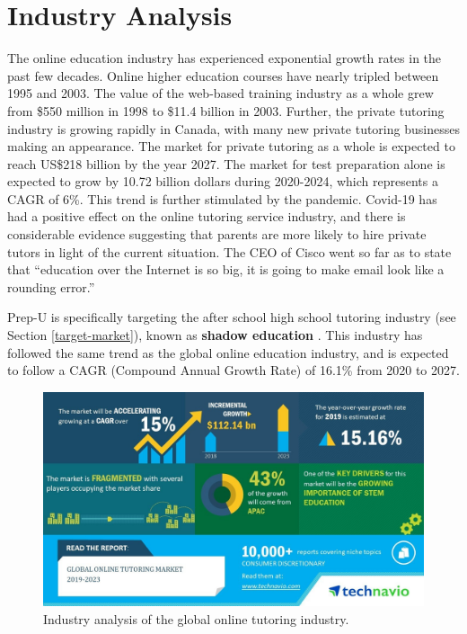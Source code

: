 \documentclass{business}
\begin{document}
    \section{Industry Analysis}\label{industry-analysis}
    The online education industry has experienced exponential growth rates in the past few decades. Online higher education courses have nearly tripled between 1995 and 2003. \cite{Wiest2012} The value of the web-based training industry as a whole grew from \$550 million in 1998 to \$11.4 billion in 2003. \cite{Singh2004} Further, the private tutoring industry is growing rapidly in Canada, with many new private tutoring businesses making an appearance. \cite{Davies} The market for private tutoring as a whole is expected to reach US\$218 billion by the year 2027. \cite{Private2020} The market for test preparation alone is expected to grow by 10.72 billion dollars during 2020-2024, which represents a CAGR of 6\%. \cite{TestPrep2020} This trend is further stimulated by the pandemic. Covid-19 has had a positive effect on the online tutoring service industry, and there is considerable evidence suggesting that parents are more likely to hire private tutors in light of the current situation. The CEO of Cisco went so far as to state that ``education over the Internet is so big, it is going to make email look like a rounding error.''\par
    Prep-U is specifically targeting the after school high school tutoring industry (see Section \ref{target-market}), known as \textbf{shadow education} \cite{Zhang}. This industry has followed the same trend as the global online education industry, and is expected to follow a CAGR (Compound Annual Growth Rate) of 16.1\% from 2020 to 2027. \cite{Online2020} 
    \begin{figure}[H]
        \centering
        \caption{Industry analysis of the global online tutoring industry. \cite{Global2019}}
        \includegraphics[scale=0.3]{./images/infographic-1.jpg}
    \end{figure}
\end{document}
